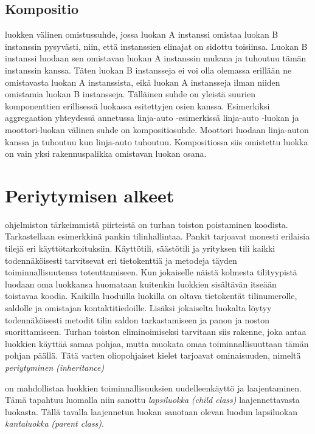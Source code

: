 \documentclass{tufte-book}
\newcommand{\eng}[1]{\textit{(#1)}}
\newcommand{\new}[1]{\textit{\gls{#1}}}
\newcommand{\neweng}[2]{\new{#1} \eng{#2}}
\begin{document}
\subsection{Kompositio}
\label{kompositio}

 luokken välinen omistussuhde, jossa luokan A instanssi omistaa
luokan B instanssin pysyvästi, niin, että instanssien elinajat on sidottu toisiinsa. Luokan B
instanssi luodaan sen omistavan luokan A instanssin mukana ja tuhoutuu tämän instanssin kanssa.
Täten luokan B instansseja ei voi olla olemassa erillään ne omistavasta luokan A instanssista,
eikä luokan A instansseja ilman niiden omistamia luokan B instansseja. Tälläinen suhde on yleistä
suurien komponenttien erillisessä luokassa esitettyjen osien kanssa. Esimerkiksi aggregaation
yhteydessä annetussa linja-auto -esimerkissä linja-auto -luokan ja moottori-luokan välinen suhde
on kompositiosuhde. Moottori luodaan linja-auton kanssa ja tuhoutuu kun linja-auto tuhoutuu.
Kompositiossa siis omistettu luokka on vain yksi rakennuspalikka omistavan luokan osana.


\section{Periytymisen alkeet}
\label{periytyminen1}

 ohjelmiston tärkeimmistä piirteistä on turhan toiston poistaminen
koodista. Tarkastellaan esimerkkinä pankin tilinhallintaa. Pankit tarjoavat monesti erilaisia
tilejä eri käyttötarkoituksiin. Käyttötili, säästötili ja yrityksen tili kaikki todennäköisesti
tarvitsevat eri tietokenttiä ja metodeja täyden toiminnallisuutensa toteuttamiseen. Kun jokaiselle
näistä kolmesta tilityypistä luodaan oma luokkansa huomataan kuitenkin luokkien sisältävän
itseään toistavaa koodia. Kaikilla luoduilla luokilla on oltava tietokentät tilinumerolle,
saldolle ja omistajan kontaktitiedoille. Lisäksi jokaiselta luokalta löytyy todennäköisesti
metodit tilin saldon tarkastamiseen ja panon ja noston suorittamiseen. Turhan toiston
eliminoimiseksi tarvitaan siis rakenne, joka antaa luokkien käyttää samaa pohjaa, mutta muokata
omaa toiminnallisuuttaan tämän pohjan päällä. Tätä varten oliopohjaiset kielet tarjoavat
ominaisuuden, nimeltä \neweng{periytyminen}{inheritance}

 on mahdollistaa luokkien toiminnallisuuksien uudelleenkäyttö
ja laajentaminen. Tämä tapahtuu luomalla niin sanottu \neweng{lapsiluokka}{child class}
laajennettavasta luokasta. Tällä tavalla laajennetun luokan sanotaan olevan luodun lapsiluokan
\neweng{kantaluokka}{parent class}.
\end{document}
